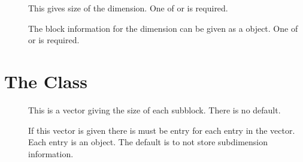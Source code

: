 \begin{description}
  \item[] This gives size of the dimension.  One of  or
         is required.

  \item[] The block information for the dimension can be
        given as a  object.  One of  or
         is required.

\end{description}


\section{The  Class}
\label{SCBlockInfo}

\begin{description}
  \item[]  This is a vector giving the size of each
        subblock.  There is no default.

  \item[] If this vector is given there is must be entry for
        each entry in the  vector.  Each entry is an
         object.  The default is to not store
        subdimension information.

\end{description}
